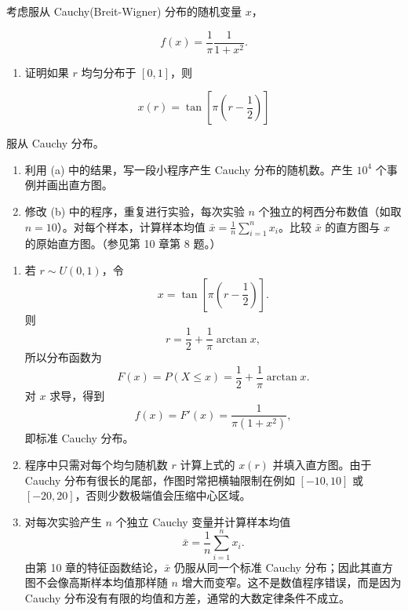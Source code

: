 \begin{question}
考虑服从 Cauchy(Breit-Wigner) 分布的随机变量 \(x\)，

\[
f(x)=\frac{1}{\pi}\frac{1}{1+x^2}.
\]

\begin{enumerate}
\item
  证明如果 \(r\) 均匀分布于 \([0,1]\)，则
\end{enumerate}

\[
x(r)=\tan\left[\pi\left(r-\frac{1}{2}\right)\right]
\]

服从 Cauchy 分布。

\begin{enumerate}[start=2]
\item
  利用 (a) 中的结果，写一段小程序产生 Cauchy 分布的随机数。产生 \(10^4\)
  个事例并画出直方图。
\item
  修改 (b) 中的程序，重复进行实验，每次实验 \(n\)
  个独立的柯西分布数值（如取 \(n=10\)）。对每个样本，计算样本均值
  \(\bar{x}=\frac1n\sum_{i=1}^{n}x_i\)。比较 \(\bar{x}\) 的直方图与
  \(x\) 的原始直方图。（参见第 10 章第 8 题。）
\end{enumerate}
\begin{solution}
\begin{enumerate}
\item 若 \(r\sim U(0,1)\)，令
\[
x=\tan\left[\pi\left(r-\frac12\right)\right].
\]
则
\[
r=\frac12+\frac1\pi\arctan x,
\]
所以分布函数为
\[
F(x)=P(X\le x)=\frac12+\frac1\pi\arctan x.
\]
对 \(x\) 求导，得到
\[
f(x)=F'(x)=\frac1{\pi(1+x^2)},
\]
即标准 Cauchy 分布。

\item 程序中只需对每个均匀随机数 \(r\) 计算上式的 \(x(r)\) 并填入直方图。由于 Cauchy
分布有很长的尾部，作图时常把横轴限制在例如 \([-10,10]\) 或 \([-20,20]\)，否则少数极端值会压缩中心区域。

\item 对每次实验产生 \(n\) 个独立 Cauchy 变量并计算样本均值
\[
\bar x=\frac1n\sum_{i=1}^n x_i.
\]
由第 10 章的特征函数结论，\(\bar x\) 仍服从同一个标准 Cauchy 分布；因此其直方图不会像高斯样本均值那样随 \(n\) 增大而变窄。这不是数值程序错误，而是因为 Cauchy 分布没有有限的均值和方差，通常的大数定律条件不成立。
\end{enumerate}
\end{solution}
\end{question}


